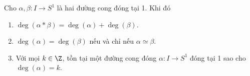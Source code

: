 	\begin{proposition}
		Cho $\alpha, \beta: I \to S^1$ là hai đường cong đóng tại 1. Khi đó
		
		\begin{enumerate}
			\item %
			$\deg(\alpha*\beta) = \deg(\alpha) + \deg(\beta)$.
			
			\item %
			$	\deg(\alpha) = \deg(\beta)$ nếu và chỉ nếu $\alpha\simeq \beta$.
			
			\item Với mọi 
			$k \in \Z$, tồn tại một đường cong đóng $\alpha: I \to S^1$ 
			đóng tại 1 sao cho $\deg(\alpha) = k$.
		\end{enumerate}
	\end{proposition}
	
